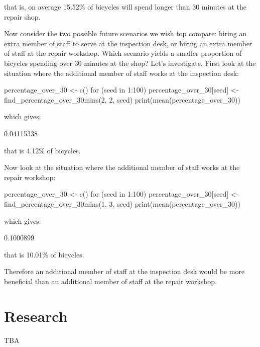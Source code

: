 that is, on average 15.52\% of bicycles will spend longer than 30 minutes at the
repair shop.

Now consider the two possible future scenarios we wish top compare: hiring an
extra member of staff to serve at the inspection desk, or hiring an extra member
of staff at the repair workshop. Which scenario yields a smaller proportion of
bicycles spending over 30 minutes at the shop? Let's investigate. First look at
the situation where the additional member of staff works at the inspection desk:

\begin{Rin}
percentage_over_30 <- c()
for (seed in 1:100) {
  percentage_over_30[seed] <- find_percentage_over_30mins(2, 2, seed)
}
print(mean(percentage_over_30))
\end{Rin}

which gives:

\begin{Rout}
[1] 0.04115338
\end{Rout}

that is 4.12\% of bicycles.

Now look at the situation where the additional member of staff works at the
repair workshop:

\begin{Rin}
percentage_over_30 <- c()
for (seed in 1:100) {
  percentage_over_30[seed] <- find_percentage_over_30mins(1, 3, seed)
}
print(mean(percentage_over_30))
\end{Rin}

which gives:

\begin{Rout}
[1] 0.1000899
\end{Rout}

that is 10.01\% of bicycles.

Therefore an additional member of staff at the inspection desk would be more
beneficial than an additional member of staff at the repair workshop.


\section{Research}\label{sec:research}

TBA

